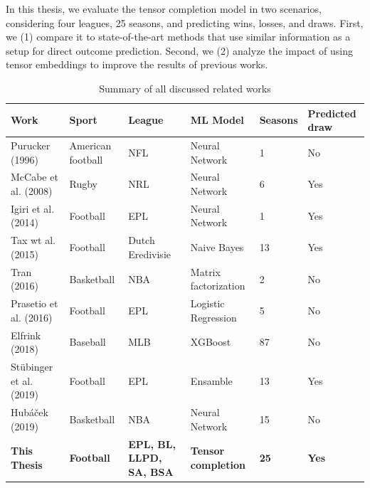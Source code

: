 \documentclass[thesis=M,english]{FITthesis}[2019/12/23]
\begin{document}
In this thesis, we evaluate the tensor completion model in two scenarios, considering four leagues, 25 seasons, and predicting wins, losses, and draws. First, we (1) compare it to state-of-the-art methods that use similar information as a setup for direct outcome prediction. Second, we (2) analyze the impact of using tensor embeddings to improve the results of previous works.
\begin{table}
\begin{center}
\begin{tabular}{ p{}p{}p{}p{}p{}p{} }
 \hline
 Work & Sport & League & ML Model & Seasons & Predicted draw \\ 
 \hline
 Purucker (1996)~\cite{NFL_first_study} & American football & NFL & Neural Network & 1 & No \\ 
 McCabe et al. (2008)~\cite{NN_more_sports} & Rugby & NRL & Neural Network & 6 & Yes \\
 Igiri et al. (2014)~\cite{BPL_ANN_logistic_regression} & Football & EPL & Neural Network & 1 & Yes \\
 Tax wt al. (2015)~\cite{Dutch_football} & Football & Dutch Eredivisie & Naive Bayes & 13 & Yes \\
 Tran (2016)~\cite{NBA_matrix_factorization} & Basketball & NBA & Matrix factorization & 2 & No \\
 Prasetio et al. (2016)~\cite{BPL_logistic_regression} & Football & EPL & Logistic Regression & 5 & No \\
 Elfrink (2018)~\cite{MLB_regression} & Baseball & MLB & XGBoost & 87 & No \\
 Stübinger et al. (2019)~\cite{football_players} & Football & EPL & Ensamble & 13 & Yes \\
 Hubáček (2019)~\cite{NBA_convolution} & Basketball & NBA & Neural Network & 15 & No \\
 \textbf{This Thesis} & \textbf{Football} & \textbf{EPL, BL, LLPD, SA, BSA} & \textbf{Tensor completion} & \textbf{25} & \textbf{Yes} \\
 \hline
\end{tabular}
\caption{Summary of all discussed related works}
\label{table:works}
\end{center}
\end{table}
\end{document}
